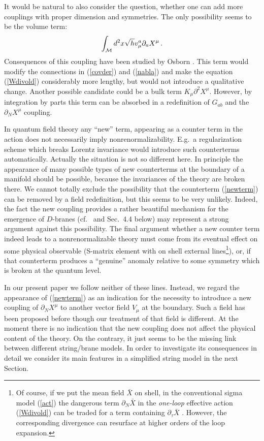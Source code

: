 \documentclass[a4paper,12pt]{article}
\begin{document}
It would be natural to also consider the question, 
 whether one can add more couplings
with proper dimension and symmetries. The only possibility
seems to be the volume term:
\begin{equation}
\int_{\cal M} d^2 x\sqrt{h} v_\mu^a \partial_a X^\mu \,.
\label{osbcoupl}
\end{equation}
Consequences of this coupling have been studied by Osborn
\cite{Osborn91}. This term would modify the connections
in (\ref{covder}) and (\ref{nabla}) and make the
equation (\ref{Wdivold}) considerably more lengthy,
but would not introduce a qualitative 
change. Another
possible candidate could be a bulk term $K_\mu \partial^2X^\mu$.
However, by integration by parts this term can be absorbed in
a redefinition of $G_{ab}$ and the $\partial_N X^\mu$ coupling.


In quantum field theory any 
``new'' term, appearing as a counter term in the action does not 
necessarily imply nonrenormalizability. E.g.\ a 
regularization scheme which breaks Lorentz invariance would 
introduce such counterterms automatically. Actually the 
situation is not so different here. In principle the 
appearance of many possible types of new counterterms at 
the boundary of a manifold should be possible, because the 
invariances of the theory are broken there.  
We cannot totally exclude the possibility that the counterterm
(\ref{newterm}) can be removed by a field redefinition, but
this seems to be very unlikely. Indeed, the fact the new coupling 
provides a rather beautiful mechanism for 
the emergence of $D$-branes (cf.\ \cite{DLP89,Leigh89} and 
Sec.\ 4.4 below) may represent a strong argument against this 
possibility.
The final 
argument whether a new counter term indeed leads to a 
nonrenormalizable theory must come from its eventual 
effect on some physical observable (S-matrix element with 
on shell external lines\footnote{Of course, if we put the mean
field $\bar X$ on shell, in the conventional sigma model (\ref{act})
the dangerous term $\partial_N\bar X$ in the {\it one-loop}
effective action (\ref{Wdivold})
can be traded for a term containing $\partial_\tau \bar X$
\cite{Callan88}. However, the corresponding divergence can
resurface at higher orders of the loop expansion.}), 
or, if that counterterm produces a 
``genuine'' anomaly relative to some symmetry which is 
broken at the quantum level. 

In our present paper we follow neither of these lines. 
Instead, we regard the appearance of (\ref{newterm}) as an indication 
for the necessity to introduce a new coupling of 
$\partial_NX^\mu$ to another 
vector field $V_\mu$ at the boundary. 
Such a field has been 
proposed before 
\cite{dornotto86,DLP89,Leigh89,behrndtdorn92,dornotto96,Ellis97,Mavromatos99}
though our treatment of that field is different.
At the moment there is
no indication that the new coupling does not affect the physical
content of the theory. On the contrary, it just seems to be 
the missing link between different string/brane models.
In order to investigate its 
consequences in detail we consider its main features in a 
simplified string model in the next Section. 
\end{document}
